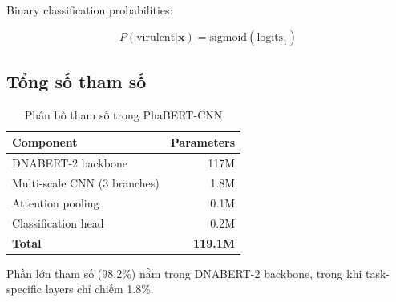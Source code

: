 Binary classification probabilities:

\begin{equation}
P(\text{virulent} | \mathbf{x}) = \text{sigmoid}(\text{logits}_1)
\end{equation}

\subsection{Tổng số tham số}

\begin{table}[h]
\centering
\caption{Phân bố tham số trong PhaBERT-CNN}
\label{tab:parameters}
\begin{tabular}{lr}
\toprule
\textbf{Component} & \textbf{Parameters} \\
\midrule
DNABERT-2 backbone & 117M \\
Multi-scale CNN (3 branches) & 1.8M \\
Attention pooling & 0.1M \\
Classification head & 0.2M \\
\midrule
\textbf{Total} & \textbf{119.1M} \\
\bottomrule
\end{tabular}
\end{table}

Phần lớn tham số (98.2\%) nằm trong DNABERT-2 backbone, trong khi task-specific layers chỉ chiếm 1.8\%.
